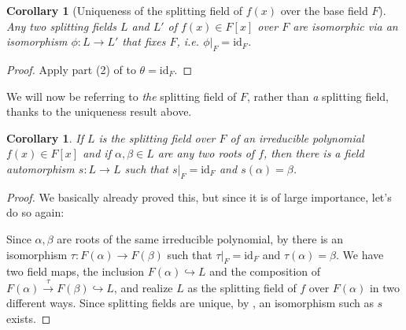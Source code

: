 \documentclass[12pt]{report}
\newtheorem{corollary}[theorem]{Corollary}
\numberwithin{equation}{section}
\numberwithin{theorem}{chapter}
\theoremstyle{definition}
\newtheorem*{basic properties}{Basic Properties}
\newtheorem*{Important Remark}{Important Remark}
\begin{document}


\begin{corollary}[Uniqueness of the splitting field of $f(x)$ over the base field $F$]\label{uniqueness of splitting fields}
Any two splitting fields $L$ and $L'$ of $f(x) \in F[x]$ over $F$ are isomorphic  via an isomorphism $\phi:L\to L'$ that fixes $F$, i.e. $\phi|_F=\mathrm{id}_F$.
\end{corollary}

\begin{proof}
Apply part (2) of  to $\theta=\mathrm{id}_F$.
\end{proof}

We will now be referring to \emph{the} splitting field of $F$, rather than \emph{a} splitting field, thanks to the uniqueness result above.


\begin{corollary}\label{por418}
If $L$ is the splitting field over $F$ of an irreducible polynomial $f(x) \in F[x]$ and if $\alpha, \beta \in L$ are any two roots of $f$, then there is a field automorphism $s\!: L \to L$ such that $s|_F = \mathrm{id}_F$ and $s(\alpha) = \beta$.
\end{corollary}

\begin{proof} 
We basically already proved this, but since it is of large importance, let's do so again:

Since $\alpha, \beta$ are roots of the same irreducible polynomial, by  there is an isomorphism $\tau: F(\alpha) \to F(\beta)$ such that $\tau|_F = \mathrm{id}_F$ and $\tau(\alpha) = \beta$.
We have two field maps, the inclusion $F(\alpha) \hookrightarrow L$ and the composition of $F(\alpha) \xrightarrow{\tau} F(\beta) \hookrightarrow L$, and realize $L$ as the splitting field of $f$ over $F(\alpha)$ in two different ways. Since splitting fields are unique, by , an isomorphism such as $s$ exists.
\end{proof}
\end{document}
